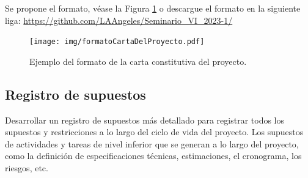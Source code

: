 \documentclass[letterpaper,12pt,openright,oneside]{article}
\theoremstyle{plain}
\begin{document}
Se propone el formato, véase la Figura \ref{CartaConstitutiva} o descargue el formato en la siguiente liga: \url{https://github.com/LAAngeles/Seminario_VI_2023-1/}
% 
% 
\begin{figure}[h]
    \centering
    \texttt{[image: img/formatoCartaDelProyecto.pdf]}
    \caption{Ejemplo del formato de la carta constitutiva del proyecto.}
    \label{CartaConstitutiva}
\end{figure}
% 
% 
\subsection*{Registro de supuestos}

Desarrollar un registro de supuestos más detallado para registrar todos los supuestos y restricciones a lo largo del ciclo de vida del proyecto.
Los supuestos de actividades y tareas de nivel inferior que se generan a lo largo del proyecto, como la definición de especificaciones técnicas, estimaciones, el cronograma, los riesgos, etc. 
% 
% 
\end{document}
